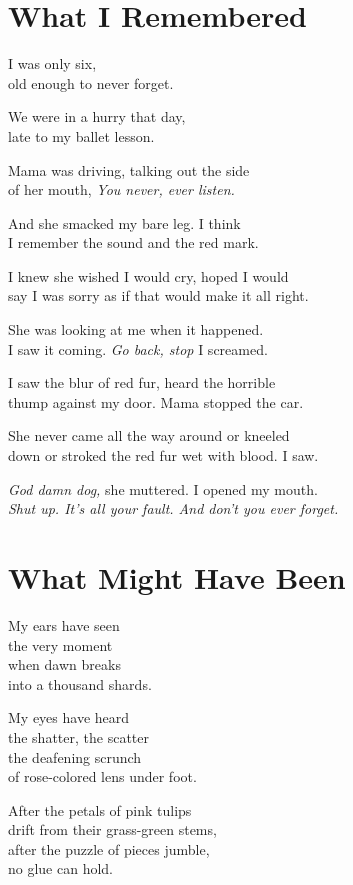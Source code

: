 \documentclass[twoside,10pt]{book}
\begin{document}
\clearpage
\section{What I Remembered}

I was only six,\\
old enough to never forget.

We were in a hurry that day,\\
late to my ballet lesson.

Mama was driving, talking out the side\\
of her mouth, \emph{You never, ever listen.}

And she smacked my bare leg. I think\\
I remember the sound and the red mark.

I knew she wished I would cry, hoped I would\\
say I was sorry as if that would make it all right.

She was looking at me when it happened.\\
I saw it coming. \emph{Go back, stop} I screamed.

I saw the blur of red fur, heard the horrible\\
thump against my door. Mama stopped the car.

She never came all the way around or kneeled\\
down or stroked the red fur wet with blood. I saw.

\emph{God damn dog,} she muttered. I opened my mouth.\\
\emph{Shut up. It's all your fault. And don't you ever forget.}


\clearpage
\section{What Might Have Been}

My ears have seen\\
the very moment\\
when dawn breaks\\
into a thousand shards.

My eyes have heard\\
the shatter, the scatter\\
the deafening scrunch\\
of rose-colored lens under foot.

After the petals of pink tulips\\
drift from their grass-green stems,\\
after the puzzle of pieces jumble,\\
no glue can hold.
\end{document}
